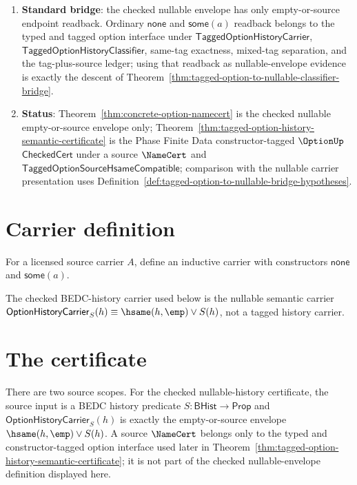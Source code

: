 \begin{enumerate}
  \item \textbf{Standard bridge}: the checked nullable envelope has only empty-or-source endpoint readback. Ordinary $\mathsf{none}$ and $\mathsf{some}(a)$ readback belongs to the typed and tagged option interface under $\mathsf{TaggedOptionHistoryCarrier}$, $\mathsf{TaggedOptionHistoryClassifier}$, same-tag exactness, mixed-tag separation, and the tag-plus-source ledger; using that readback as nullable-envelope evidence is exactly the descent of Theorem~\ref{thm:tagged-option-to-nullable-classifier-bridge}.
  \item \textbf{Status}: Theorem~\ref{thm:concrete-option-namecert} is the checked nullable empty-or-source envelope only; Theorem~\ref{thm:tagged-option-history-semantic-certificate} is the Phase Finite Data constructor-tagged $\OptionUp$ $\mathsf{CheckedCert}$ under a source $\NameCert$ and $\mathsf{TaggedOptionSourceHsameCompatible}$; comparison with the nullable carrier presentation uses Definition~\ref{def:tagged-option-to-nullable-bridge-hypotheses}.
\end{enumerate}

\section{Carrier definition}

\begin{definition}
\label{def:option-carrier}
For a licensed source carrier \(A\), define an inductive carrier with constructors \(\mathsf{none}\) and \(\mathsf{some}(a)\).
\end{definition}

The checked BEDC-history carrier used below is the nullable semantic carrier $\mathsf{OptionHistoryCarrier}_S(h)\equiv \hsame(h,\emp)\lor S(h)$, not a tagged history carrier.

\section{The certificate}

\begin{definition}
\label{def:option-source-specification}
There are two source scopes. For the checked nullable-history certificate, the
source input is a BEDC history predicate $S:\mathsf{BHist}\to\mathsf{Prop}$ and
$\mathsf{OptionHistoryCarrier}_S(h)$ is exactly the empty-or-source envelope
$\hsame(h,\emp)\lor S(h)$. A source $\NameCert$ belongs only to the typed and
constructor-tagged option interface used later in
Theorem~\ref{thm:tagged-option-history-semantic-certificate}; it is not part of
the checked nullable-envelope definition displayed here.
\end{definition}

